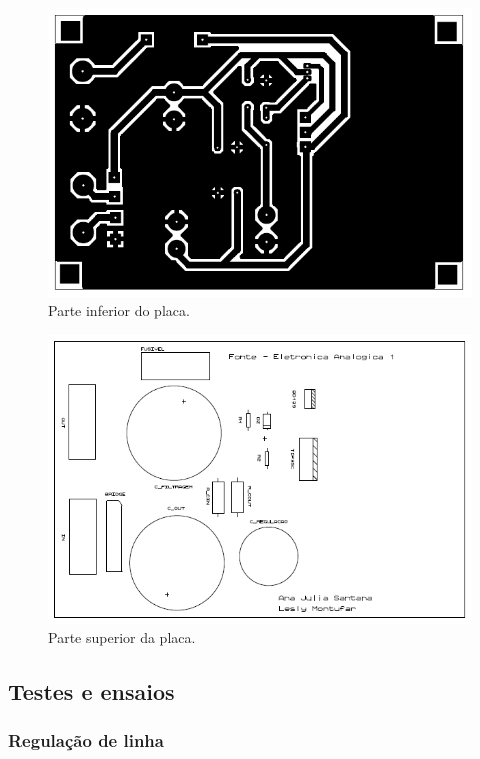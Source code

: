 \documentclass[a4paper,12pt,oneside,openany,table,xcdraw]{article}
\begin{document}
\begin{figure}[H]
\centering
\captionsetup{font=scriptsize}
\includegraphics[width=15cm]{bottom}
\caption{Parte inferior do placa.}
\label{bottom}
\end{figure}

\begin{figure}[H]
\centering
\captionsetup{font=scriptsize}
\includegraphics[width=15cm]{top}
\caption{Parte superior da placa.}
\label{top}
\end{figure}

\subsection{Testes e ensaios} %
\subsubsection{Regulação de linha}
\end{document}
